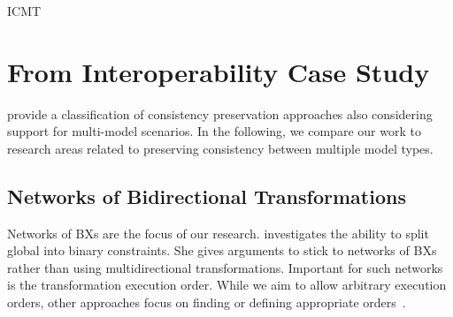 \begin{copiedFrom}{ICMT}

\section{From Interoperability Case Study}

\textcite{macedo2017ModelRepairClassification-TSE} provide a classification of consistency preservation approaches also considering support for multi-model scenarios. %
In the following, we compare our work to research areas related to preserving consistency between multiple model types.

\subsection*{Networks of Bidirectional Transformations} 
Networks of \acp{BX} are the focus of our research.
\textcite{stevens2020BidirectionalTransformationLarge-SoSym} investigates the ability to split global into binary constraints.
She gives arguments to stick to networks of \acp{BX} rather than using multidirectional transformations. %
Important for such networks is the transformation execution order. 
While we aim to allow arbitrary execution orders, other approaches focus on finding or defining appropriate orders~\cite{stevens2020BuildingFromMegamodels-SoSym}.



\end{copiedFrom}

